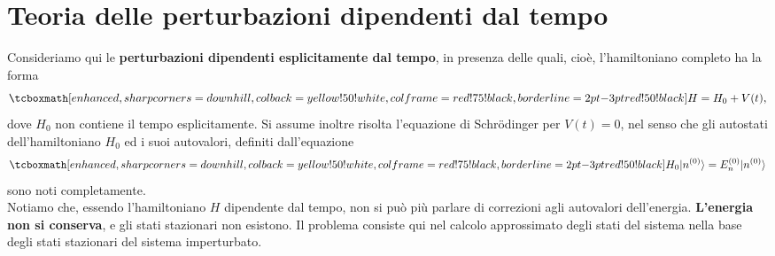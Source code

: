 \documentclass[a4paper,12pt,oneside]{book}
\newcommand*{\myfont}{\fontfamily{ppl}\selectfont}
\begin{document}
\fancypagestyle{plain}{%
\fancyhf{} %
\fancyfoot[C]{\bfseries \myfont{\thepage}} %
\renewcommand{\headrulewidth}{0pt}
\renewcommand{\footrulewidth}{0pt}}

\fancypagestyle{VS}{
\headheight = 15pt
\lhead[\myfont{\textit{\textbf{\thechapter\nouppercase{\leftmark}}}}]{\myfont{\textit{\textbf{\nouppercase{\leftmark}}}}}
\chead[]{}
\rhead[\myfont{\textbf{\thepage}}]{\myfont{\textbf{\thepage}}}

\lfoot[]{}
\cfoot[]{}
\rfoot[]{}
}



\pagestyle{VS}
\setcounter{chapter}{14}
\setcounter{page}{153}
\chapter[T.d.P. dipendenti dal tempo]{Teoria delle perturbazioni dipendenti dal tempo}
Consideriamo qui le \textbf{perturbazioni dipendenti esplicitamente dal tempo}, in presenza delle quali, cioè, l'hamiltoniano completo ha la forma
	\begin{equation}
		\tcboxmath[enhanced, sharp corners=downhill, colback=yellow!50!white, colframe=red!75!black, borderline={2pt}{-3pt}{red!50!black}]{					H=H_0+V(t),
		}
	\end{equation}
dove $H_0$ non contiene il tempo esplicitamente. Si assume inoltre risolta l'equazione di Schr\"{o}dinger per $V(t)=0$, nel senso che gli autostati dell'hamiltoniano $H_0$ ed i suoi autovalori, definiti dall'equazione
	\begin{equation}
		\tcboxmath[enhanced, sharp corners=downhill, colback=yellow!50!white, colframe=red!75!black, borderline={2pt}{-3pt}{red!50!black}]{
			H_0 \vert n ^{(0)} \rangle = E_n ^{(0)} \vert n ^{(0)} \rangle 
			}
	\end{equation}
sono noti completamente.\\

Notiamo che, essendo l'hamiltoniano $H$ dipendente dal tempo, non si può più parlare di correzioni agli autovalori dell'energia. \textbf{L'energia non si conserva}, e gli stati stazionari non esistono. Il problema consiste qui nel calcolo approssimato degli stati del sistema nella base degli stati stazionari del sistema imperturbato.\\
\end{document}
